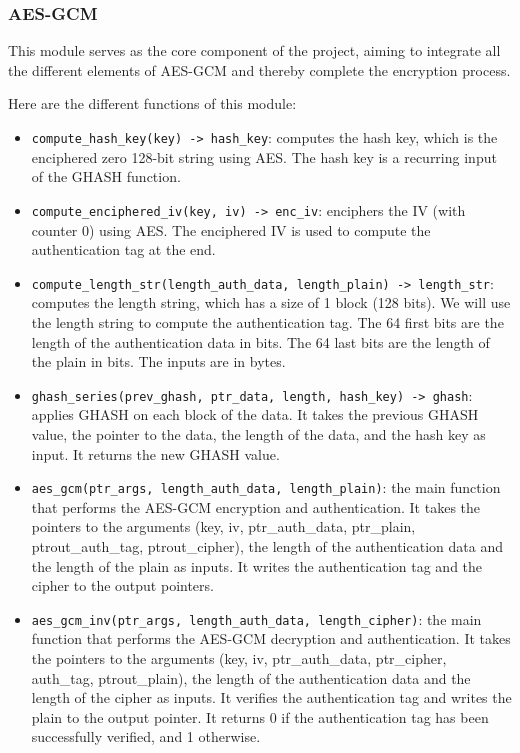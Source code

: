 \documentclass[runningheads]{llncs}
\begin{document}
\subsubsection{AES-GCM}

This module serves as the core component of the project, aiming to integrate all the different elements of AES-GCM and thereby complete the encryption process.

Here are the different functions of this module:
\begin{itemize}
    \item \texttt{compute\_hash\_key(key) -> hash\_key}: computes the hash key, which is the enciphered zero 128-bit string using AES. The hash key is a recurring input of the GHASH function.
    \item \texttt{compute\_enciphered\_iv(key, iv) -> enc\_iv}: enciphers the IV (with counter 0) using AES. The enciphered IV is used to compute the authentication tag at the end.
    \item \texttt{compute\_length\_str(length\_auth\_data, length\_plain) -> length\_str}: computes the length string, which has a size of 1 block (128 bits). We will use the length string to compute the authentication tag. The 64 first bits are the length of the authentication data in bits. The 64 last bits are the length of the plain in bits. The inputs are in bytes.
    \item \texttt{ghash\_series(prev\_ghash, ptr\_data, length, hash\_key) -> ghash}: applies GHASH on each block of the data. It takes the previous GHASH value, the pointer to the data, the length of the data, and the hash key as input. It returns the new GHASH value.

    \item \texttt{aes\_gcm(ptr\_args, length\_auth\_data, length\_plain)}: the main function that performs the AES-GCM encryption and authentication. It takes the pointers to the arguments (key, iv, ptr\_auth\_data, ptr\_plain, ptrout\_auth\_tag, ptrout\_cipher), the length of the authentication data and the length of the plain as inputs. It writes the authentication tag and the cipher to the output pointers.
    \item \texttt{aes\_gcm\_inv(ptr\_args, length\_auth\_data, length\_cipher)}: the main function that performs the AES-GCM decryption and authentication. It takes the pointers to the arguments (key, iv, ptr\_auth\_data, ptr\_cipher, auth\_tag, ptrout\_plain), the length of the authentication data and the length of the cipher as inputs. It verifies the authentication tag and writes the plain to the output pointer. It returns 0 if the authentication tag has been successfully verified, and 1 otherwise.
\end{itemize}
\end{document}
